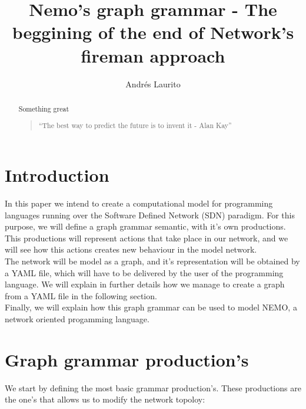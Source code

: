 \documentclass[envcountsect,runningheads]{llncs}
\title{Nemo's graph grammar - The beggining of the end of Network's fireman approach}
\author{Andr\'es Laurito}
\institute{
Departamento de Computac\'on - FCEN -UBA\\
 \email{andy.laurito@gmail.com} }
\begin{document}
\maketitle

\begin{abstract}
 Something great 
\begin{quotation}
 ``The best way to predict the future is to invent it - Alan Kay''
\end{quotation}

\end{abstract}

\section{Introduction}

In this paper we intend to create a computational model for programming languages 
running over the Software Defined Network (SDN) paradigm. For this purpose, we will 
define a graph grammar semantic, with it's own productions. This productions will 
represent actions that take place in our network, and we will see how this 
actions creates new behaviour in the model network. \\
The network will be model as a graph, and it's representation will be obtained by a YAML 
file, which will have to be delivered by the user of the programming language. We will explain
in further details how we manage to create a graph from a YAML file in the following section. \\ 
Finally, we will explain how this graph grammar can be used to model NEMO, a 
network oriented progamming language.

\section{Graph grammar production's}

We start by defining the most basic grammar production's. These 
productions are the one's that allows us to modify the network topoloy:
\end{document}
